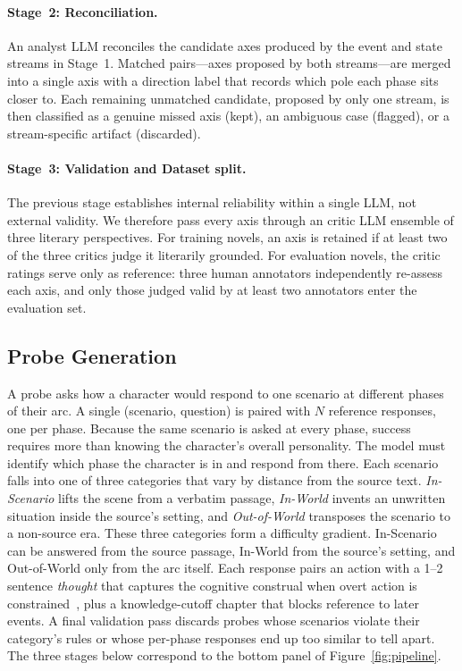 \documentclass{llmxive}
\begin{document}
\paragraph{Stage~2: Reconciliation.}
An analyst LLM reconciles the candidate axes produced by the event and state streams in Stage~1. Matched pairs---axes proposed by both streams---are merged into a single axis with a direction label that records which pole each phase sits closer to. Each remaining unmatched candidate, proposed by only one stream, is then classified as a genuine missed axis (kept), an ambiguous case (flagged), or a stream-specific artifact (discarded).

\paragraph{Stage~3: Validation and Dataset split.}
The previous stage establishes internal reliability within a single LLM, not external validity. We therefore pass every axis through an critic LLM ensemble of three literary perspectives. For training novels, an axis is retained if at least two of the three critics judge it literarily grounded. For evaluation novels, the critic ratings serve only as reference: three human annotators independently re-assess each axis, and only those judged valid by at least two annotators enter the evaluation set.

\subsection{Probe Generation\label{sec:probe}}

A probe asks how a character would respond to one scenario at different phases of their arc. A single (scenario, question) is paired with $N$ reference responses, one per phase. Because the same scenario is asked at every phase, success requires more than knowing the character's overall personality. The model must identify which phase the character is in and respond from there. Each scenario falls into one of three categories that vary by distance from the source text. \emph{In-Scenario} lifts the scene from a verbatim passage, \emph{In-World} invents an unwritten situation inside the source's setting, and \emph{Out-of-World} transposes the scenario to a non-source era. These three categories form a difficulty gradient. In-Scenario can be answered from the source passage, In-World from the source's setting, and Out-of-World only from the arc itself. Each response pairs an action with a 1--2 sentence \emph{thought} that captures the cognitive construal when overt action is constrained~\cite{Mischel1995ACS}, plus a knowledge-cutoff chapter that blocks reference to later events. A final validation pass discards probes whose scenarios violate their category's rules or whose per-phase responses end up too similar to tell apart. The three stages below correspond to the bottom panel of Figure~\ref{fig:pipeline}.
\end{document}
